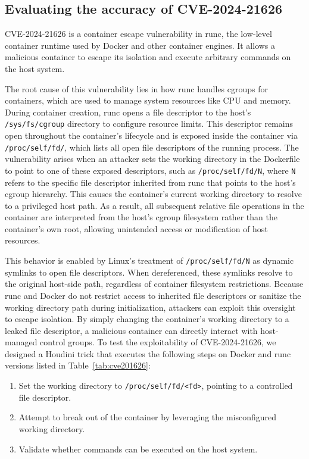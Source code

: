 \documentclass[12pt]{report}
\begin{document}
\begin{doublespace}




\section{Evaluating the accuracy of CVE-2024-21626}

CVE-2024-21626 \cite{runc-cve-2024-21626} is a container escape vulnerability in runc, the low-level container runtime used by Docker and other container engines. It allows a malicious container to escape its isolation and execute arbitrary commands on the host system.

The root cause of this vulnerability lies in how runc handles cgroups for containers, which are used to manage system resources like CPU and memory. During container creation, runc opens a file descriptor to the host's \texttt{/sys/fs/cgroup} directory to configure resource limits. This descriptor remains open throughout the container’s lifecycle and is exposed inside the container via \texttt{/proc/self/fd/}, which lists all open file descriptors of the running process. The vulnerability arises when an attacker sets the working directory in the Dockerfile to point to one of these exposed descriptors, such as \texttt{/proc/self/fd/N}, where \texttt{N} refers to the specific file descriptor inherited from runc that points to the host’s cgroup hierarchy. This causes the container’s current working directory to resolve to a privileged host path. As a result, all subsequent relative file operations in the container are interpreted from the host’s cgroup filesystem rather than the container’s own root, allowing unintended access or modification of host resources.

This behavior is enabled by Linux's treatment of \texttt{/proc/self/fd/N} as dynamic symlinks to open file descriptors. When dereferenced, these symlinks resolve to the original host-side path, regardless of container filesystem restrictions. Because runc and Docker do not restrict access to inherited file descriptors or sanitize the working directory path during initialization, attackers can exploit this oversight to escape isolation. By simply changing the container's working directory to a leaked file descriptor, a malicious container can directly interact with host-managed control groups.
To test the exploitability of CVE-2024-21626, we designed a Houdini trick that executes the following steps on Docker and runc versions listed in Table~\ref{tab:cve201626}:
\begin{enumerate}
    \item Set the working directory to \texttt{/proc/self/fd/<fd>}, pointing to a controlled file descriptor.
    \item Attempt to break out of the container by leveraging the misconfigured working directory.
    \item Validate whether commands can be executed on the host system.
\end{enumerate}


\end{doublespace}
\end{document}
